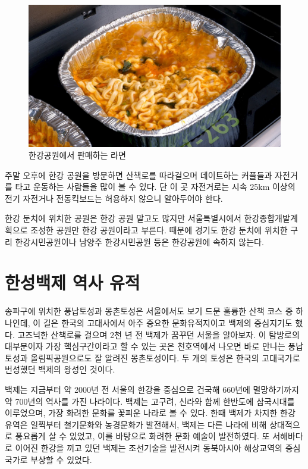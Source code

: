 \begin{figure}
    \centering
    \includegraphics[width=.6\textwidth]{e_img/ww_-003.jpg}
    \caption{한강공원에서 판매하는 라면}
    \label{fig:haryu4}
\end{figure}

주말 오후에 한강 공원을 방문하면 산책로를 따라걸으며 데이트하는 커플들과 자전거를
타고 운동하는 사람들을 많이 볼 수 있다. 단 이 곳 자전거로는 시속 25km 이상의
전기 자전거나 전동킥보드는 허용하지 않으니 알아두어야 한다.


한강 둔치에 위치한 공원은 한강 공원 말고도 많지만 서울특별시에서 한강종합개발계획으로
조성한 공원만 한강 공원이라고 부른다. 때문에 경기도 한강 둔치에 위치한 구리
한강시민공원이나 남양주 한강시민공원 등은 한강공원에 속하지 않는다.


\section{한성백제 역사 유적}

송파구에 위치한 풍납토성과 몽촌토성은 서울에서도 보기 드문 훌륭한 산책 코스 중
하나인데, 이 길은 한국의 고대사에서 아주 중요한 문화유적지이고 백제의 중심지기도 했다.
고즈넉한 산책로를 걸으며 2천 년 전 백제가 꿈꾸던 서울을 알아보자.
이 탐방로의 대부분이자 가장 핵심구간이라고 할 수 있는 곳은 천호역에서 나오면 바로
만나는 풍납토성과 올림픽공원으로도 잘 알려진 몽촌토성이다. 두 개의 토성은 한국의
고대국가로 번성했던 백제의 왕성인 것이다.


백제는 지금부터 약 2000년 전 서울의 한강을 중심으로 건국해 660년에 멸망하기까지
약 700년의 역사를 가진 나라이다. 백제는 고구려, 신라와 함께 한반도에 삼국시대를
이루었으며, 가장 화려한 문화를 꽃피운 나라로 볼 수 있다. 한때 백제가 차지한 한강 유역은
일찍부터 철기문화와 농경문화가 발전해서, 백제는 다른 나라에 비해 상대적으로 풍요롭게
살 수 있었고, 이를 바탕으로 화려한 문화 예술이 발전하였다. 또 서해바다로 이어진
한강을 끼고 있던 백제는 조선기술을 발전시켜 동북아시아 해상교역의 중심국가로 부상할
수 있었다.



